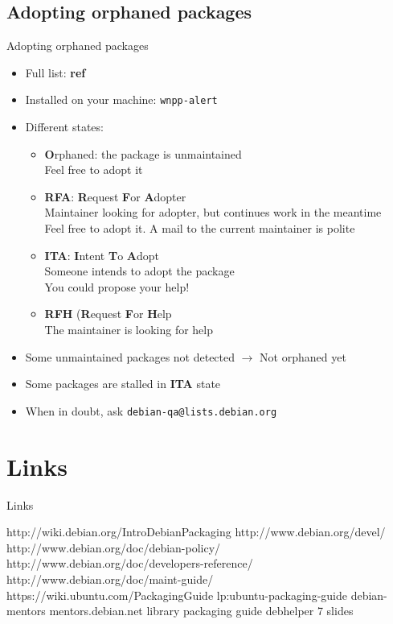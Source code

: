 \documentclass[10pt,final,handout]{beamer}
\newcommand{\arr}{\textbf{$\rightarrow$}\xspace}
\newcommand{\fixme}[1]{ {\color{red}\footnotesize\bf #1}}
\begin{document}
\subsection{Adopting orphaned packages}
\begin{frame}{Adopting orphaned packages}
\begin{itemize}
	\item Full list: \fixme{ref}
	\item Installed on your machine: \texttt{wnpp-alert}
	\item Different states:
	\begin{itemize}
		\item \textbf{O}rphaned: the package is unmaintained\\
			Feel free to adopt it
		\item \textbf{RFA}: \textbf{R}equest \textbf{F}or \textbf{A}dopter\\
			Maintainer looking for adopter, but continues work in the meantime\\
			Feel free to adopt it. A mail to the current maintainer is polite
		\item \textbf{ITA}: \textbf{I}ntent \textbf{T}o \textbf{A}dopt\\
			Someone intends to adopt the package\\
			You could propose your help!
		\item \textbf{RFH} (\textbf{R}equest \textbf{F}or \textbf{H}elp\\
			The maintainer is looking for help
	\end{itemize}
	\item Some unmaintained packages not detected \arr Not orphaned yet
	\item Some packages are stalled in \textbf{ITA} state
	\item When in doubt, ask \texttt{debian-qa@lists.debian.org}
	\end{itemize}
\end{frame}

\section{Links}
\begin{frame}{Links}

http://wiki.debian.org/IntroDebianPackaging
http://www.debian.org/devel/
http://www.debian.org/doc/debian-policy/
http://www.debian.org/doc/developers-reference/
http://www.debian.org/doc/maint-guide/
https://wiki.ubuntu.com/PackagingGuide
lp:ubuntu-packaging-guide
debian-mentors
mentors.debian.net
library packaging guide
debhelper 7 slides
\end{frame}
\end{document}
